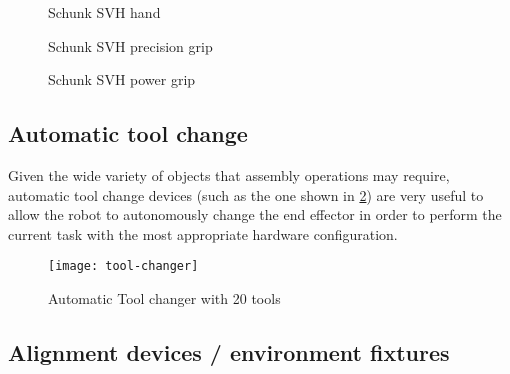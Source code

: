 \begin{figure}[H]
	\begin{floatrow}[3]
		{\caption[Schunk SVH hand]{Schunk SVH hand\protect\footnotemark}\label{fig:schunk-svh}}
		{\caption[Schunk SVH precision grip]{Schunk SVH precision grip\protect\footnotemark[\value{footnote}]}\label{fig:schunk-svh-precision-grip}}
		{\caption[Schunk SVH power grip]{Schunk SVH power grip\protect\footnotemark[\value{footnote}]}\label{fig:schunk-svh-power-grip}}
	\end{floatrow}
\end{figure}






\subsection{Automatic tool change}

Given the wide variety of objects that assembly operations may require, automatic tool change devices (such as the one shown in \cref{fig:tool-changer}) are very useful to allow the robot to autonomously change the end effector in order to perform the current task with the most appropriate hardware configuration.

\begin{figure}[H]
	\centering
	\texttt{[image: tool-changer]}
	\caption{Automatic Tool changer with 20 tools}
	\label{fig:tool-changer}
\end{figure}


\subsection{Alignment devices / environment fixtures}

